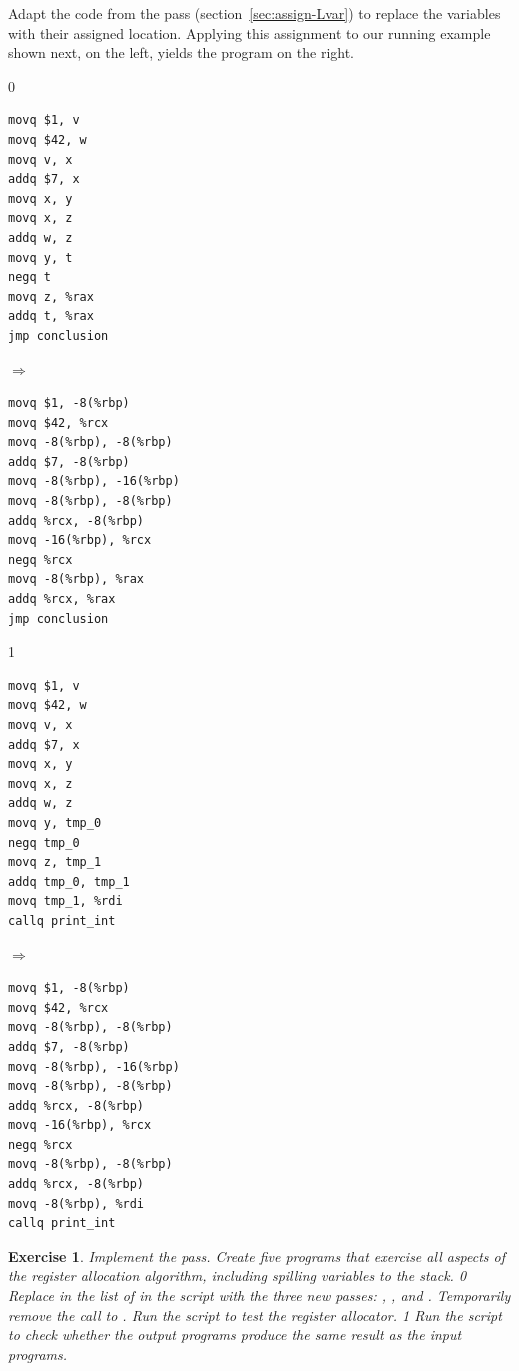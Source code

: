 \documentclass[7x10]{TimesAPriori_MIT}%
\def\racketEd{0}
\def\pythonEd{1}
\def\edition{1}
\newcommand{\pythonColor}[0]{}
\newtheorem{exercise}[theorem]{Exercise}
\numberwithin{theorem}{chapter}
\numberwithin{definition}{chapter}
\numberwithin{equation}{chapter}
\begin{document}
Adapt the code from the  pass
(section~\ref{sec:assign-Lvar}) to replace the variables with their
assigned location. Applying this assignment to our running
example shown next, on the left, yields the program on the right.
\begin{center}
{\if\edition\racketEd      
\begin{minipage}{0.35\textwidth}
\begin{lstlisting}
movq $1, v
movq $42, w
movq v, x
addq $7, x
movq x, y
movq x, z
addq w, z
movq y, t
negq t
movq z, %rax
addq t, %rax
jmp conclusion
\end{lstlisting}
\end{minipage}
$\Rightarrow\qquad$
\begin{minipage}{0.45\textwidth}
\begin{lstlisting}
movq $1, -8(%rbp)
movq $42, %rcx
movq -8(%rbp), -8(%rbp)
addq $7, -8(%rbp)
movq -8(%rbp), -16(%rbp)
movq -8(%rbp), -8(%rbp)
addq %rcx, -8(%rbp)
movq -16(%rbp), %rcx
negq %rcx
movq -8(%rbp), %rax
addq %rcx, %rax
jmp conclusion
\end{lstlisting}
\end{minipage}
\fi}
{\if\edition\pythonEd\pythonColor
\begin{minipage}{0.35\textwidth}
\begin{lstlisting}
movq $1, v
movq $42, w
movq v, x
addq $7, x
movq x, y
movq x, z
addq w, z
movq y, tmp_0
negq tmp_0
movq z, tmp_1
addq tmp_0, tmp_1
movq tmp_1, %rdi
callq print_int
\end{lstlisting}
\end{minipage}
$\Rightarrow\qquad$
\begin{minipage}{0.45\textwidth}
\begin{lstlisting}
movq $1, -8(%rbp)
movq $42, %rcx
movq -8(%rbp), -8(%rbp)
addq $7, -8(%rbp)
movq -8(%rbp), -16(%rbp)
movq -8(%rbp), -8(%rbp)
addq %rcx, -8(%rbp)
movq -16(%rbp), %rcx
negq %rcx
movq -8(%rbp), -8(%rbp)
addq %rcx, -8(%rbp)
movq -8(%rbp), %rdi
callq print_int    
\end{lstlisting}
\end{minipage}
\fi}
\end{center}

\begin{exercise}\normalfont\normalsize
Implement the  pass.
Create five programs that exercise all aspects of the register
allocation algorithm, including spilling variables to the stack.
%
{\if\edition\racketEd      
Replace  in the list of  in the
 script with the three new passes:
, , and
.
Temporarily remove the call to .
Run the script to test the register allocator.
\fi}
%
{\if\edition\pythonEd\pythonColor      
Run the  script to check whether the
output programs produce the same result as the input programs.
\fi}
\end{exercise}
\end{document}
